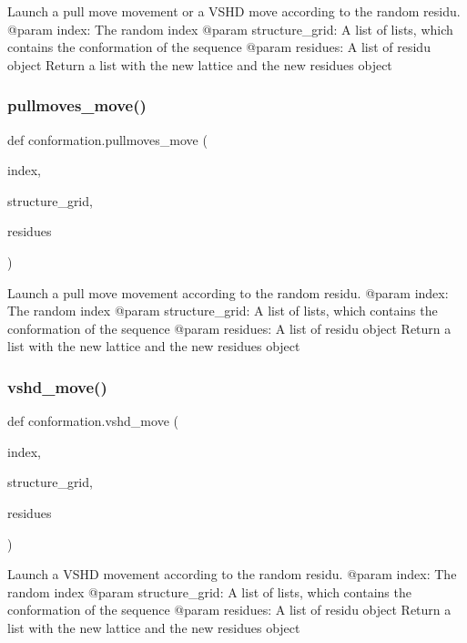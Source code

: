 \begin{DoxyVerb}Launch a pull move movement or a VSHD move according to
the random residu.
    @param index: The random index
    @param structure_grid: A list of lists, which contains the
                           conformation of the sequence
    @param residues: A list of residu object
    Return a list with the new lattice and the new residues object
\end{DoxyVerb}
 \mbox{\label{namespaceconformation_a46040be6196d233d4eeea6dec428bce3}} 
\subsubsection{\texorpdfstring{pullmoves\+\_\+move()}{pullmoves\_move()}}
{\footnotesize\ttfamily def conformation.\+pullmoves\+\_\+move (\begin{DoxyParamCaption}\item[{}]{index,  }\item[{}]{structure\+\_\+grid,  }\item[{}]{residues }\end{DoxyParamCaption})}

\begin{DoxyVerb}Launch a pull move movement according to the random residu.
    @param index: The random index
    @param structure_grid: A list of lists, which contains the
                           conformation of the sequence
    @param residues: A list of residu object
    Return a list with the new lattice and the new residues object
\end{DoxyVerb}
 \mbox{\label{namespaceconformation_a68e0c087ab604cbc37a7fe9a27622d8c}} 
\subsubsection{\texorpdfstring{vshd\+\_\+move()}{vshd\_move()}}
{\footnotesize\ttfamily def conformation.\+vshd\+\_\+move (\begin{DoxyParamCaption}\item[{}]{index,  }\item[{}]{structure\+\_\+grid,  }\item[{}]{residues }\end{DoxyParamCaption})}

\begin{DoxyVerb}Launch a VSHD movement according to the random residu.
    @param index: The random index
    @param structure_grid: A list of lists, which contains the
                           conformation of the sequence
    @param residues: A list of residu object
    Return a list with the new lattice and the new residues object
\end{DoxyVerb}
 